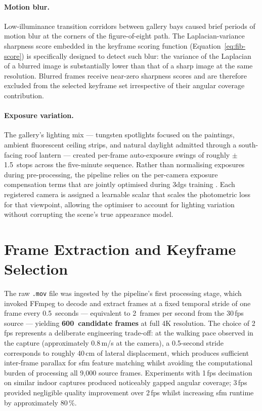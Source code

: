 \paragraph{Motion blur.} Low-illuminance transition corridors between gallery bays caused brief periods of motion blur at the corners of the figure-of-eight path. The Laplacian-variance sharpness score embedded in the keyframe scoring function (Equation~\ref{eq:fib-score}) is specifically designed to detect such blur: the variance of the Laplacian of a blurred image is substantially lower than that of a sharp image at the same resolution. Blurred frames receive near-zero sharpness scores and are therefore excluded from the selected keyframe set irrespective of their angular coverage contribution.

\paragraph{Exposure variation.} The gallery's lighting mix — tungsten spotlights focused on the paintings, ambient fluorescent ceiling strips, and natural daylight admitted through a south-facing roof lantern — created per-frame auto-exposure swings of roughly $\pm$1.5~stops across the five-minute sequence. Rather than normalising exposures during pre-processing, the pipeline relies on the per-camera exposure compensation terms that are jointly optimised during \acrshort{3dgs} training \parencite{Kerbl2023}. Each registered camera is assigned a learnable scalar that scales the photometric loss for that viewpoint, allowing the optimiser to account for lighting variation without corrupting the scene's true appearance model.

\section{Frame Extraction and Keyframe Selection}
\label{sec:recon-keyframe}

The raw \texttt{.mov} file was ingested by the pipeline's first processing stage, which invoked FFmpeg to decode and extract frames at a fixed temporal stride of one frame every 0.5~seconds — equivalent to 2~frames per second from the 30\,fps source — yielding \textbf{600~candidate frames} at full 4K resolution. The choice of 2\,fps represents a deliberate engineering trade-off: at the walking pace observed in the capture (approximately 0.8\,m/s at the camera), a 0.5-second stride corresponds to roughly 40\,cm of lateral displacement, which produces sufficient inter-frame parallax for \acrshort{sfm} feature matching whilst avoiding the computational burden of processing all 9,000 source frames. Experiments with 1\,fps decimation on similar indoor captures produced noticeably gapped angular coverage; 3\,fps provided negligible quality improvement over 2\,fps whilst increasing \acrshort{sfm} runtime by approximately 80\,\%.

